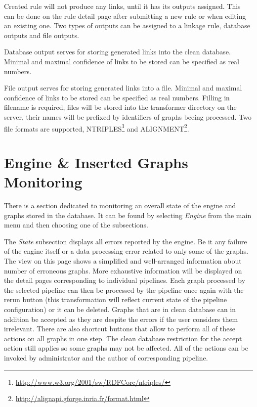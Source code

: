 Created rule will not produce any links, until it has its outputs assigned. This can be done on the rule detail page after submitting a new rule or when editing an existing one. Two types of outputs can be assigned to a linkage rule, database outputs and file outputs.

Database output serves for storing generated links into the clean database. Minimal and maximal confidence of links to be stored can be specified as real numbers.

File output serves for storing generated links into a file. Minimal and maximal confidence of links to be stored can be specified as real numbers. Filling in filename is required, files will be stored into the transformer directory on the server, their names will be prefixed by identifiers of graphs beeing processed. Two file formats are supported, NTRIPLES\footnote{\url{http://www.w3.org/2001/sw/RDFCore/ntriples/}} and ALIGNMENT\footnote{\url{http://alignapi.gforge.inria.fr/format.html}}. 

\section{Engine \& Inserted Graphs Monitoring}
\label{sec:engineState}

There is a section dedicated to monitoring an overall state of the engine and graphs stored in the database. It can be found by selecting \emph{Engine} from the main menu and then choosing one of the subsections.

The \emph{State} subsection displays all errors reported by the engine. Be it any failure of the engine itself or a data processing error related to only some of the graphs. The view on this page shows a simplified and well-arranged information about number of erroneous graphs. More exhaustive information will be displayed on the detail pages corresponding to individual pipelines. Each graph processed by the selected pipeline can then be processed by the pipeline once again with the rerun button (this transformation will reflect current state of the pipeline configuration)
or it can be deleted. Graphs that are in clean database can in addition be accepted as they are despite the errors if the user considers them irrelevant.
There are also shortcut buttons that allow to perform all of these actions on all graphs in one step. The clean database restriction for the accept action still applies so some graphs may not be affected. All of the actions can be invoked by administrator and the author of corresponding pipeline.

